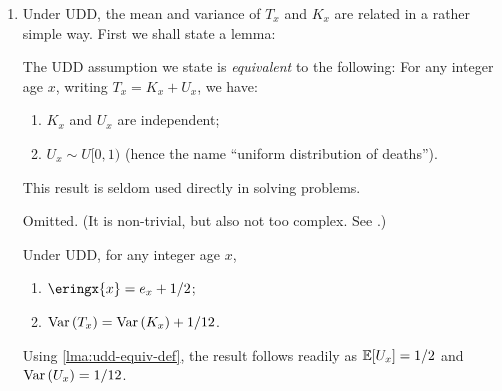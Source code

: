 \begin{enumerate}
\begin{enumerate}
\item \label{it:udd-fom-fmla}
For any integer age \(x\) and any \(t\in[0,1)\), \(\displaystyle
\mu_{x+t}=\frac{q_x}{1-tq_x}\).

\begin{pf}
Note that
\[
\mu_{x+t}=\frac{f_x(t)}{\px[t]{x}}
=\frac{\displaystyle \dv{}{t}\qx[t]{x}}{1-\qx[t]{x}}
=\frac{\displaystyle \dv{}{t}tq_x}{1-tq_x}
=\frac{q_x}{1-tq_x}.
\]
\end{pf}
\end{enumerate}



\item Under UDD, the mean and variance of \(T_x\) and \(K_x\) are related in a rather simple way.
First we shall state a lemma:
\begin{lemma}
\label{lma:udd-equiv-def}
The UDD assumption we state is \emph{equivalent} to
the following: For any integer age \(x\), writing
\(T_x=K_x+U_x\), we have:
\begin{enumerate}
\item \(K_x\) and \(U_x\) are independent;
\item \(U_x\sim U[0,1)\) (hence the name ``uniform distribution of deaths'').
\end{enumerate}
\end{lemma}

\begin{note}
This result is seldom used directly in solving problems.
\end{note}

\begin{pf}
Omitted. (It is non-trivial, but also not too complex. See \textcite[Section~3.3.1]{dickson2019actuarial}.)
\end{pf}

\begin{proposition}
\label{prp:udd-mean-variance}
Under UDD, for any integer age \(x\),
\begin{enumerate}
\item \(\eringx{x}=e_x+1/2\);
\item \(\operatorname{Var}\qty(T_x)=\operatorname{Var}\qty(K_x)+1/12\).
\end{enumerate}
\end{proposition}

\begin{pf}
Using \cref{lma:udd-equiv-def}, the result follows readily as
\(\mathbb{E}\qty[U_x]=1/2\) and \(\operatorname{Var}\qty(U_x)=1/12\).
\end{pf}


\end{enumerate}
